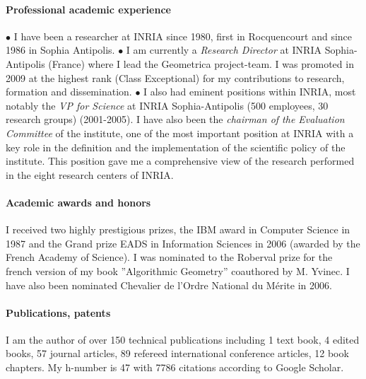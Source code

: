 \paragraph{Professional academic experience}\mbox{}

 $\bullet$ I have been a researcher at INRIA since 1980, first in Rocquencourt and since 1986 in Sophia Antipolis.  $\bullet$  I am currently a {\em Research Director} at INRIA Sophia-Antipolis (France) where I lead the Geometrica project-team. I was promoted in 2009 at the highest rank (Class Exceptional) for my contributions to research, formation and dissemination. $\bullet$ I also had eminent positions within INRIA, most notably  
the {\em VP for Science}  at INRIA Sophia-Antipolis (500 employees, 30 research groups) (2001-2005).
I have also been  the {\em chairman of the Evaluation Committee} of the institute, one of the most important position at INRIA with a key role in the definition and the implementation
of the scientific policy of the institute.  This position gave me  a comprehensive view of the research performed in the eight research centers of INRIA.



\paragraph{Academic awards and honors}\mbox{}

I received two highly prestigious prizes, the IBM award in Computer Science  in 1987
and the Grand prize EADS in Information Sciences in 2006 (awarded by the French Academy of Science).  I was nominated to the Roberval prize for the french version of my book ”Algorithmic Geometry” coauthored by M. Yvinec. I have also been nominated Chevalier de l'Ordre National du M\'erite in 2006.

\paragraph{Publications, patents} \mbox{}

I am the author of over 150 technical publications including 1 text book, 4 edited books, 57 journal articles, 89 refereed international conference articles, 12 book chapters. My h-number is 47 with 7786 citations according to Google Scholar. 

